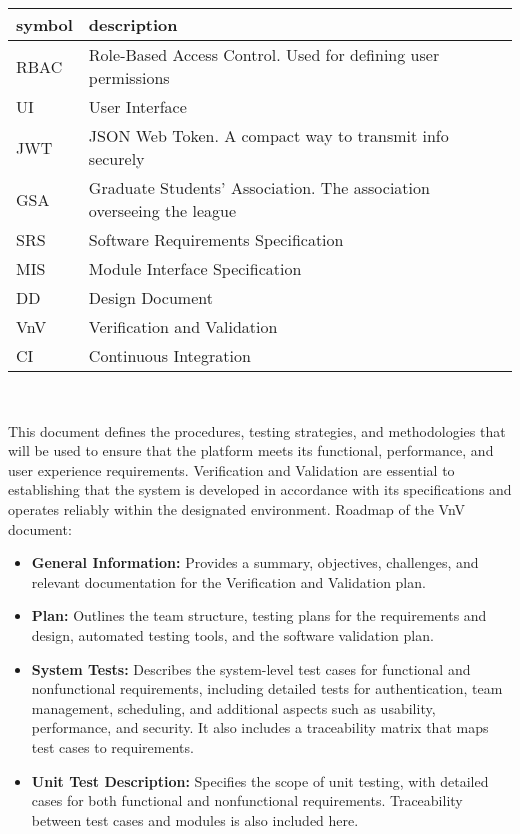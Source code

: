 \documentclass[12pt, titlepage]{article}
\begin{document}
\renewcommand{\arraystretch}{1.2}
\begin{tabular}{l l} 
  \toprule		
  \textbf{symbol} & \textbf{description}\\
  \midrule 
  RBAC & Role-Based Access Control. Used for defining user permissions\\
  UI & User Interface\\
  JWT & JSON Web Token. A compact way to transmit info securely\\
  GSA & Graduate Students' Association. The association overseeing the league\\
  SRS & Software Requirements Specification \\
  MIS & Module Interface Specification \\
  DD & Design Document \\
  VnV & Verification and Validation \\
  CI & Continuous Integration \\
  \bottomrule
\end{tabular}\\

\newpage


This document defines the procedures, testing strategies, and methodologies that will be used to ensure that the platform meets its functional, performance, and user experience requirements. Verification and Validation are essential to establishing that the system is developed in accordance with its specifications and operates reliably within the designated environment.
Roadmap of the VnV document:
\begin{itemize}
  \item \textbf{General Information:} Provides a summary, objectives, challenges, and relevant documentation for the Verification and Validation plan.
  \item \textbf{Plan:} Outlines the team structure, testing plans for the requirements and design, automated testing tools, and the software validation plan.
  \item \textbf{System Tests:} Describes the system-level test cases for functional and nonfunctional requirements, including detailed tests for authentication, team management, scheduling, and additional aspects such as usability, performance, and security. It also includes a traceability matrix that maps test cases to requirements.
  \item \textbf{Unit Test Description:} Specifies the scope of unit testing, with detailed cases for both functional and nonfunctional requirements. Traceability between test cases and modules is also included here.
\end{itemize}
\end{document}
